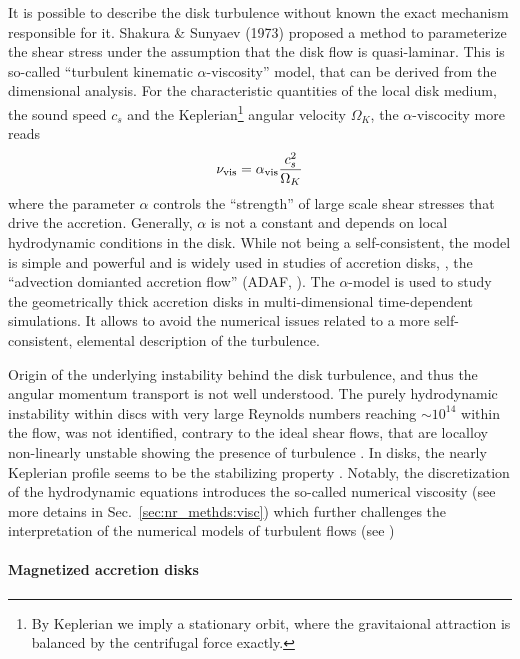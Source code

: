 It is possible to describe the disk turbulence without known the exact mechanism responsible 
for it. Shakura \& Sunyaev (1973) \cite{Shakura & Sunyaev (1973)} proposed a method to 
parameterize the shear stress under the assumption that the disk flow is quasi-laminar. 
This is so-called ``turbulent kinematic $\alpha$-viscosity'' model, that can be derived 
from the dimensional analysis. For the characteristic quantities of the local disk medium, 
the sound speed $c_s$ and the Keplerian\footnote{
    By Keplerian we imply a stationary orbit, where the gravitaional attraction is balanced 
    by the centrifugal force exactly.
} angular velocity $\Omega_K$, the $\alpha$-viscocity more reads 
%
\begin{equation}
    \nu_{\rm vis} = \alpha_{\rm vis} \frac{c_{s}^2}{\Omega_K}
\end{equation}
%
where the parameter $\alpha$ controls the ``strength'' of large scale shear stresses that drive 
the accretion. Generally, $\alpha$ is not a constant and depends on local hydrodynamic 
conditions in the disk. While not being a self-consistent, the model is simple and powerful 
and is widely used in studies of accretion disks, \eg, the 
``advection domianted accretion flow'' (ADAF, \cite{Narayan & Yi, 1994}). 
The $\alpha$-model is used to study the geometrically thick accretion disks in 
multi-dimensional time-dependent simulations. It allows to avoid the numerical issues 
related to a more self-consistent, elemental description of the turbulence.
\cite{(e.g. Stone et al., 1999; Igumenshchev et al., 2000 Lee et al., 2005 
Mac-Fadyen & Woosley, 1999; Setiawan et al., 2006}

Origin of the underlying instability behind the disk turbulence, and thus the angular 
momentum transport is not well understood. The purely hydrodynamic instability within 
discs with very large Reynolds numbers reaching ${\sim}10^{14}$ within the flow, was 
not identified, contrary to the ideal shear flows, that are localloy non-linearly unstable 
showing the presence of turbulence \cite{e.g. Orszag & Kells, 1980)}. In disks, the nearly 
Keplerian profile seems to be the stabilizing property \cite{e.g. Balbus & Hawley, 1998)}.
Notably, the discretization of the hydrodynamic equations introduces the so-called 
numerical viscosity (see more detains in Sec.~\ref{sec:nr_methds:visc}) which further 
challenges the interpretation of the numerical models of turbulent flows 
(see \cite{e.g. Lesur & Papaloizou, 2010})


\paragraph{Magnetized accretion disks}

